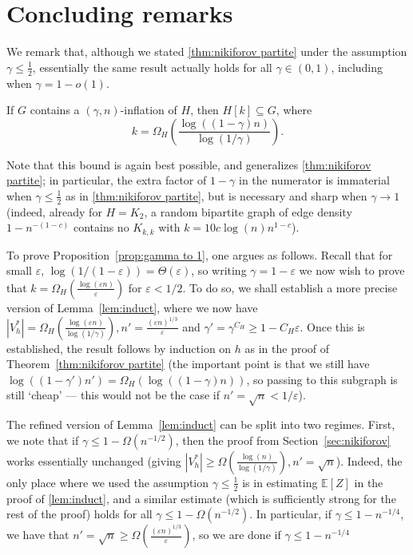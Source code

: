 \documentclass[11pt]{article}
\numberwithin{equation}{section}
\theoremstyle{plain}
\theoremstyle{remark}
\def\E{\mathbb{E}}
\newcommand{\eps}{\ensuremath{\varepsilon}}
\begin{document}
\section{Concluding remarks}\label{sec:conclusion}
We remark that, although we stated \cref{thm:nikiforov partite} under the assumption $\gamma \leq \frac 12$, essentially the same result actually holds for all $\gamma \in (0,1)$, including when $\gamma = 1-o(1)$. 
\begin{proposition}\label{prop:gamma to 1}
    If $G$ contains a $(\gamma,n)$-inflation of $H$, then $H[k]\subseteq G$, where
    \[
    k = \Omega_H \left( \frac{\log((1-\gamma)n)}{\log(1/\gamma)}\right).
    \]
\end{proposition}
Note that this bound is again best possible, and generalizes \cref{thm:nikiforov partite}; in particular, the extra factor of $1-\gamma$ in the numerator is immaterial when $\gamma \leq \frac 12$ as in \cref{thm:nikiforov partite}, but is necessary and sharp when $\gamma \to 1$ (indeed, already for $H=K_2$, a random bipartite graph of edge density $1-n^{-(1-c)}$ contains no $K_{k,k}$ with $k=10c\log(n)n^{1-c}$). 



To prove Proposition~\ref{prop:gamma to 1}, one argues as follows.
Recall that for small $\eps$, $\log(1/(1-\eps)) = \Theta(\eps)$, so writing $\gamma = 1-\eps$ we now wish to prove that $k = \Omega_H( \frac{\log(\eps n)}{\eps})$ for $\eps<1/2$. 
To do so, we shall establish a more precise version of Lemma~\ref{lem:induct}, where we now have $|V_h^*| = \Omega_H(\frac{\log(\eps n)}{\log(1/\gamma)}), n'= \frac{(\eps n)^{1/3}}{\eps}$ and $\gamma' = \gamma^{C_H}\ge 1-C_H\eps$. Once this is established, the result follows by induction on $h$ as in the proof of Theorem~\ref{thm:nikiforov partite} (the important point is that we still have $\log((1-\gamma')n') = \Omega_H(\log((1-\gamma)n))$, so passing to this subgraph is still `cheap' --- this would not be the case if $n' = \sqrt{n}<1/\eps$).

The refined version of Lemma~\ref{lem:induct} can be split into two regimes. First, we note that if $\gamma \le 1-\Omega(n^{-1/2})$, then the proof from Section~\ref{sec:nikiforov} works essentially unchanged (giving $|V_h^*| \ge \Omega(\frac{\log(n)}{\log(1/\gamma)}),n' = \sqrt{n}$). Indeed, the only place where we used the assumption $\gamma \leq \frac 12$ is in estimating $\E[Z]$ in the proof of \cref{lem:induct}, and a similar estimate (which is sufficiently strong for the rest of the proof) holds for all $\gamma \leq 1-\Omega(n^{-1/2})$. In particular, if $\gamma \le 1-n^{-1/4}$, we have that $n' =\sqrt{n} \ge \Omega(\frac{(\eps n)^{1/3}}{\eps})$, so we are done if $\gamma \le 1-n^{-1/4}$
\end{document}
